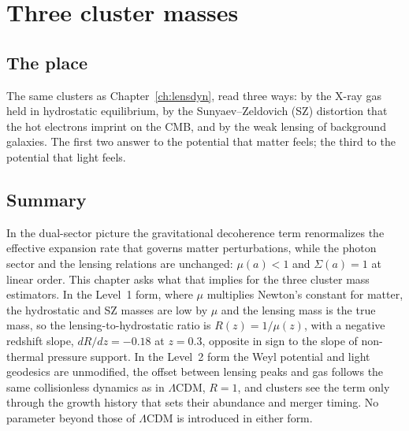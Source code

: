 \chapter{Three cluster masses}\label{ch:threeway}

\section*{The place}
The same clusters as Chapter~\ref{ch:lensdyn}, read three ways: by the X-ray gas held in hydrostatic equilibrium, by the Sunyaev--Zeldovich (SZ)
distortion that the hot electrons imprint on the CMB, and by the weak lensing of background galaxies. The first two answer to the potential that
matter feels; the third to the potential that light feels.

\section*{Summary}
In the dual-sector picture the gravitational decoherence term renormalizes the effective expansion rate that governs matter perturbations, while the
photon sector and the lensing relations are unchanged: $\mu(a)<1$ and $\Sigma(a)=1$ at linear order. This chapter asks what that implies for the three
cluster mass estimators. In the Level~1 form, where $\mu$ multiplies Newton's constant for matter, the hydrostatic and SZ masses are low by $\mu$ and
the lensing mass is the true mass, so the lensing-to-hydrostatic ratio is $R(z)=1/\mu(z)$, with a negative redshift slope, $dR/dz=-0.18$ at $z=0.3$,
opposite in sign to the slope of non-thermal pressure support. In the Level~2 form the Weyl potential and light geodesics are unmodified, the offset
between lensing peaks and gas follows the same collisionless dynamics as in $\Lambda$CDM, $R=1$, and clusters see the term only through the growth
history that sets their abundance and merger timing. No parameter beyond those of $\Lambda$CDM is introduced in either form.

